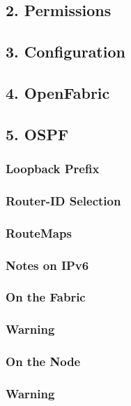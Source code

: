 \subsection{2. Permissions}

\subsection{3. Configuration}

\subsection{4. OpenFabric}

\subsection{5. OSPF}

\subsubsection{Loopback Prefix}

\subsubsection{Router-ID Selection}

\subsubsection{RouteMaps}

\subsubsection{Notes on IPv6}

\subsubsection{On the Fabric}

\subsubsection{Warning}

\subsubsection{On the Node}

\subsubsection{Warning}


